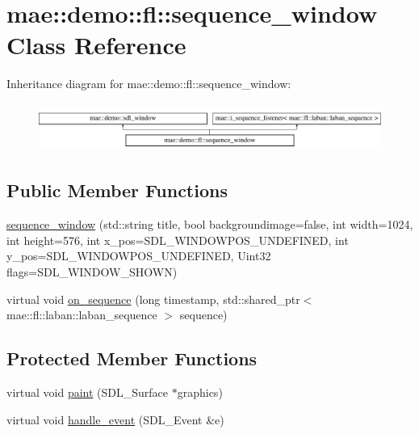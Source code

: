 \hypertarget{classmae_1_1demo_1_1fl_1_1sequence__window}{\section{mae\-:\-:demo\-:\-:fl\-:\-:sequence\-\_\-window Class Reference}
\label{classmae_1_1demo_1_1fl_1_1sequence__window}
}
Inheritance diagram for mae\-:\-:demo\-:\-:fl\-:\-:sequence\-\_\-window\-:\begin{figure}[H]
\begin{center}
\leavevmode
\includegraphics[height=1.573034cm]{classmae_1_1demo_1_1fl_1_1sequence__window}
\end{center}
\end{figure}
\subsection*{Public Member Functions}
\begin{DoxyCompactItemize}
\item 
\hyperlink{classmae_1_1demo_1_1fl_1_1sequence__window_a0f686b60ca61a3a328cd69e01912db09}{sequence\-\_\-window} (std\-::string title, bool backgroundimage=false, int width=1024, int height=576, int x\-\_\-pos=S\-D\-L\-\_\-\-W\-I\-N\-D\-O\-W\-P\-O\-S\-\_\-\-U\-N\-D\-E\-F\-I\-N\-E\-D, int y\-\_\-pos=S\-D\-L\-\_\-\-W\-I\-N\-D\-O\-W\-P\-O\-S\-\_\-\-U\-N\-D\-E\-F\-I\-N\-E\-D, Uint32 flags=S\-D\-L\-\_\-\-W\-I\-N\-D\-O\-W\-\_\-\-S\-H\-O\-W\-N)
\item 
virtual void \hyperlink{classmae_1_1demo_1_1fl_1_1sequence__window_a392112be053c0f58e9d26cb5b1d4109a}{on\-\_\-sequence} (long timestamp, std\-::shared\-\_\-ptr$<$ mae\-::fl\-::laban\-::laban\-\_\-sequence $>$ sequence)
\end{DoxyCompactItemize}
\subsection*{Protected Member Functions}
\begin{DoxyCompactItemize}
\item 
virtual void \hyperlink{classmae_1_1demo_1_1fl_1_1sequence__window_ab70f1dfc88bf7c113f2b72f29bf9811d}{paint} (S\-D\-L\-\_\-\-Surface $\ast$graphics)
\item 
virtual void \hyperlink{classmae_1_1demo_1_1fl_1_1sequence__window_aa84337da46e012c45d49462641d61f55}{handle\-\_\-event} (S\-D\-L\-\_\-\-Event \&e)
\end{DoxyCompactItemize}
